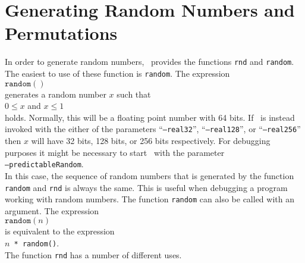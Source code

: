 \section{Generating Random Numbers and Permutations}
In order to generate random numbers, \setlx\ provides the functions \texttt{rnd} and
\texttt{random}.  The easiest to use of these function is \texttt{random}.  The expression
\\[0.2cm]
\hspace*{1.3cm}
$\texttt{random}()$
\\[0.2cm]
generates a random number $x$ such that 
\\[0.2cm]
\hspace*{1.3cm}
$0 \leq x$ \quad and \quad $x \leq 1$
\\[0.2cm]
holds.  Normally, this will be a floating point number with 64 bits.  If \setlx\ is
instead invoked with the either of the parameters ``\texttt{--real32}'',
``\texttt{--real128}'', or ``\texttt{--real256}'' then $x$ will have 32 bits, 128 bits, or
256 bits respectively.  For debugging purposes it might be necessary to start \setlx\ with
the parameter
\\[0.2cm]
\hspace*{1.3cm}
\texttt{--predictableRandom}.
\\[0.2cm]
In this case, the sequence of random numbers that is generated by the function \texttt{random} and
\texttt{rnd} is always the same.  This is useful when debugging a program working with
random numbers.  The function \texttt{random} can also be called with an argument.  The expression
\\[0.2cm]
\hspace*{1.3cm}
$\texttt{random}(n)$
\\[0.2cm]
is equivalent to the expression
\\[0.2cm]
\hspace*{1.3cm}
\texttt{$n$ * random()}.
\\[0.2cm]
The function \texttt{rnd} has a number of different uses.  
